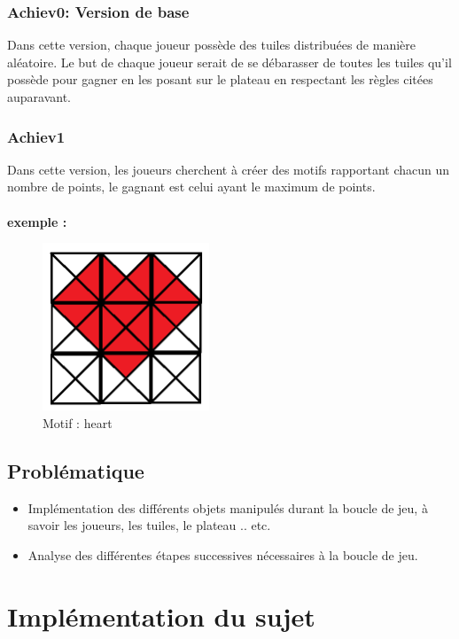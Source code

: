 \documentclass[12pt,a4paper]{extarticle}
\begin{document}
    \subsubsection{Achiev0: Version de base}
    Dans cette version, chaque joueur poss\`ede des tuiles distribu\'ees de mani\`ere al\'eatoire. Le but de chaque joueur serait de se d\'ebarasser de toutes les tuiles qu'il poss\`ede pour gagner en les posant 
    sur le plateau en respectant les r\`egles cit\'ees auparavant.
    
    \subsubsection{Achiev1}
    Dans cette version, les joueurs cherchent \`a cr\'eer des motifs rapportant chacun un nombre de points, le gagnant est celui ayant le maximum de points.
    \\ \\ \textbf{exemple :}
    \begin{figure}[h!]
        \centering
        \includegraphics[height=5cm]{img/heart}
        \caption{Motif : heart}
    \end{figure}

    \subsection{Probl\'ematique}
    \begin{itemize}

    \item Impl\'ementation des diff\'erents objets manipul\'es durant la boucle de jeu, \`a savoir les joueurs, les tuiles, le plateau .. etc. 
    \item Analyse des diff\'erentes \'etapes successives n\'ecessaires \`a la boucle de jeu. 
    
    \end{itemize}
    \newpage
    \section{Impl\'ementation du sujet}
\end{document}
